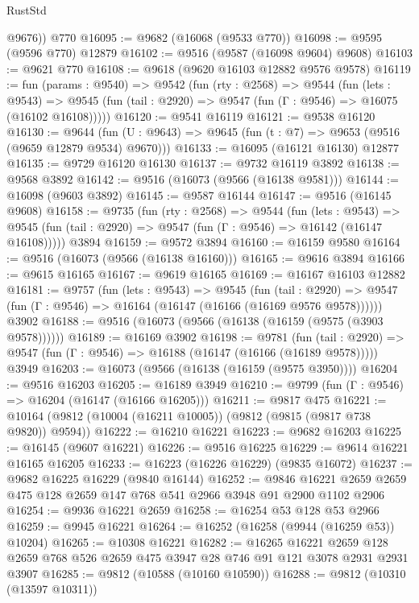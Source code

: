 \begin{lexlean}{RustStd}
\begin{coremodule}
        @9676))
    @770
@16095 := @9682 (@16068 (@9533 @770))
@16098 := @9595 (@9596 @770) @12879
@16102 := @9516 (@9587 (@16098 @9604) @9608)
@16103 := @9621 @770
@16108 := @9618 (@9620 @16103 @12882 @9576 @9578)
@16119 := fun (params : @9540) =>
  @9542
    (fun (rty : @2568) =>
    @9544
      (fun (lets : @9543) =>
      @9545 (fun (tail : @2920) => @9547 (fun (Γ : @9546) => @16075 (@16102 @16108)))))
@16120 := @9541 @16119
@16121 := @9538 @16120
@16130 := @9644
    (fun (U : @9643) => @9645 (fun (t : @7) => @9653 (@9516 (@9659 @12879 @9534) @9670)))
@16133 := @16095 (@16121 @16130) @12877
@16135 := @9729 @16120 @16130
@16137 := @9732 @16119 @3892
@16138 := @9568 @3892
@16142 := @9516 (@16073 (@9566 (@16138 @9581)))
@16144 := @16098 (@9603 @3892)
@16145 := @9587 @16144
@16147 := @9516 (@16145 @9608)
@16158 := @9735
    (fun (rty : @2568) =>
    @9544
      (fun (lets : @9543) =>
      @9545 (fun (tail : @2920) => @9547 (fun (Γ : @9546) => @16142 (@16147 @16108)))))
    @3894
@16159 := @9572 @3894
@16160 := @16159 @9580
@16164 := @9516 (@16073 (@9566 (@16138 @16160)))
@16165 := @9616 @3894
@16166 := @9615 @16165
@16167 := @9619 @16165
@16169 := @16167 @16103 @12882
@16181 := @9757
    (fun (lets : @9543) =>
    @9545
      (fun (tail : @2920) =>
      @9547 (fun (Γ : @9546) => @16164 (@16147 (@16166 (@16169 @9576 @9578))))))
    @3902
@16188 := @9516 (@16073 (@9566 (@16138 (@16159 (@9575 (@3903 @9578))))))
@16189 := @16169 @3902
@16198 := @9781
    (fun (tail : @2920) => @9547 (fun (Γ : @9546) => @16188 (@16147 (@16166 (@16189 @9578)))))
    @3949
@16203 := @16073 (@9566 (@16138 (@16159 (@9575 @3950))))
@16204 := @9516 @16203
@16205 := @16189 @3949
@16210 := @9799 (fun (Γ : @9546) => @16204 (@16147 (@16166 @16205)))
@16211 := @9817 @475
@16221 := @10164 (@9812 (@10004 (@16211 @10005)) (@9812 (@9815 (@9817 @738 @9820)) @9594))
@16222 := @16210 @16221
@16223 := @9682 @16203
@16225 := @16145 (@9607 @16221)
@16226 := @9516 @16225
@16229 := @9614 @16221 @16165 @16205
@16233 := @16223 (@16226 @16229) (@9835 @16072)
@16237 := @9682 @16225 @16229 (@9840 @16144)
@16252 := @9846 @16221 @2659 @2659 @475 @128 @2659 @147 @768 @541 @2966 @3948 @91 @2900 @1102 @2906
@16254 := @9936 @16221 @2659
@16258 := @16254 @53 @128 @53 @2966
@16259 := @9945 @16221
@16264 := @16252 (@16258 (@9944 (@16259 @53)) @10204)
@16265 := @10308 @16221
@16282 := @16265
    @16221
    @2659
    @128
    @2659
    @768
    @526
    @2659
    @475
    @3947
    @28
    @746
    @91
    @121
    @3078
    @2931
    @2931
    @3907
@16285 := @9812 (@10588 (@10160 @10590))
@16288 := @9812 (@10310 (@13597 @10311))

\end{coremodule}
\end{lexlean}
